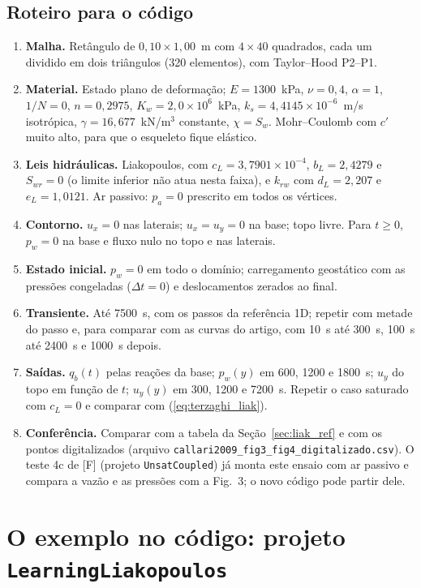 \documentclass[11pt,a4paper]{article}
\begin{document}
\subsection{Roteiro para o código}
\label{sec:liak_roteiro}
\begin{enumerate}[leftmargin=*]
\item \textbf{Malha.} Retângulo de $0{,}10\times1{,}00$~m com $4\times40$ quadrados, cada um
  dividido em dois triângulos (320 elementos), com Taylor--Hood P2--P1.
\item \textbf{Material.} Estado plano de deformação; $E=1300$~kPa, $\nu=0{,}4$, $\alpha=1$,
  $1/N=0$, $n=0{,}2975$, $K_w=2{,}0\times10^6$~kPa, $k_s=4{,}4145\times10^{-6}$~m/s isotrópica,
  $\gamma=16{,}677$~kN/m$^3$ constante, $\chi=S_w$. Mohr--Coulomb com $c'$ muito alto, para
  que o esqueleto fique elástico.
\item \textbf{Leis hidráulicas.} Liakopoulos, com $c_L=3{,}7901\times10^{-4}$, $b_L=2{,}4279$ e
  $S_{wr}=0$ (o limite inferior não atua nesta faixa), e $k_{rw}$ com $d_L=2{,}207$ e
  $e_L=1{,}0121$. Ar passivo: $p_a=0$ prescrito em todos os vértices.
\item \textbf{Contorno.} $u_x=0$ nas laterais; $u_x=u_y=0$ na base; topo livre. Para
  $t\ge0$, $p_w=0$ na base e fluxo nulo no topo e nas laterais.
\item \textbf{Estado inicial.} $p_w=0$ em todo o domínio; carregamento geostático com as
  pressões congeladas ($\Delta t=0$) e deslocamentos zerados ao final.
\item \textbf{Transiente.} Até 7500~s, com os passos da referência 1D; repetir com metade do
  passo e, para comparar com as curvas do artigo, com 10~s até 300~s, 100~s até 2400~s e
  1000~s depois.
\item \textbf{Saídas.} $q_b(t)$ pelas reações da base; $p_w(y)$ em 600, 1200 e 1800~s;
  $u_y$ do topo em função de $t$; $u_y(y)$ em 300, 1200 e 7200~s. Repetir o caso saturado
  com $c_L=0$ e comparar com (\ref{eq:terzaghi_liak}).
\item \textbf{Conferência.} Comparar com a tabela da Seção~\ref{sec:liak_ref} e com os pontos
  digitalizados (arquivo \texttt{callari2009\_fig3\_fig4\_digitalizado.csv}). O teste 4c de [F]
  (projeto \texttt{UnsatCoupled}) já monta este ensaio com ar passivo e compara a vazão e as
  pressões com a Fig.~3; o novo código pode partir dele.
\end{enumerate}

\section{O exemplo no código: projeto \texttt{LearningLiakopoulos}}
\label{sec:liak_codigo}
\end{document}
